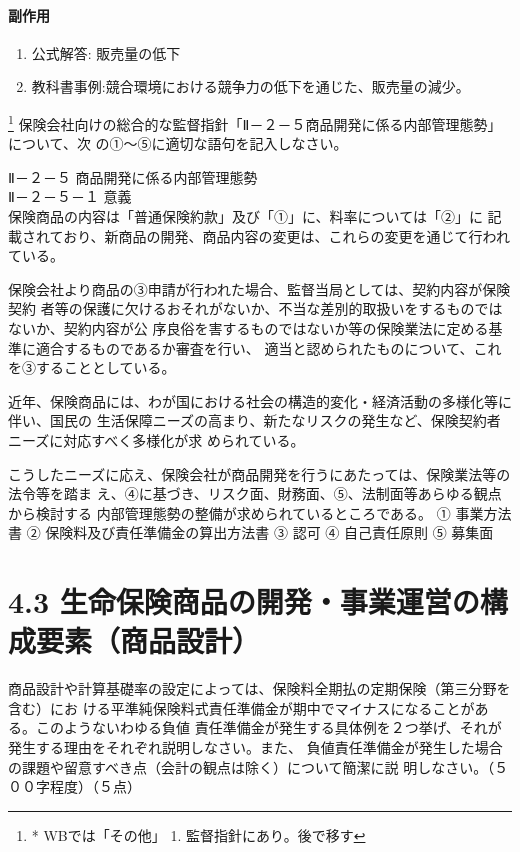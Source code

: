 \documentclass[report,gutter=10mm,fore-edge=10mm,uplatex,dvipdfmx]{jlreq}
\begin{document}
\paragraph{副作用}
\begin{enumerate}
 \item 公式解答: 販売量の低下
 \item 教科書事例:競合環境における競争力の低下を通じた、販売量の減少。
\end{enumerate}

\footnote{* WBでは「その他」 1. 監督指針にあり。後で移す}
保険会社向けの総合的な監督指針「Ⅱ－２－５商品開発に係る内部管理態勢」について、次
の①～⑤に適切な語句を記入しなさい。

Ⅱ－２－５ 商品開発に係る内部管理態勢\\
Ⅱ－２－５－１ 意義\\
保険商品の内容は「普通保険約款」及び「①」に、料率については「②」に
記載されており、新商品の開発、商品内容の変更は、これらの変更を通じて行われている。

保険会社より商品の③申請が行われた場合、監督当局としては、契約内容が保険契約
者等の保護に欠けるおそれがないか、不当な差別的取扱いをするものではないか、契約内容が公
序良俗を害するものではないか等の保険業法に定める基準に適合するものであるか審査を行い、
適当と認められたものについて、これを③することとしている。

近年、保険商品には、わが国における社会の構造的変化・経済活動の多様化等に伴い、国民の
生活保障ニーズの高まり、新たなリスクの発生など、保険契約者ニーズに対応すべく多様化が求
められている。

こうしたニーズに応え、保険会社が商品開発を行うにあたっては、保険業法等の法令等を踏ま
え、④に基づき、リスク面、財務面、⑤、法制面等あらゆる観点から検討する
内部管理態勢の整備が求められているところである。
① 事業方法書
② 保険料及び責任準備金の算出方法書
③ 認可
④ 自己責任原則
⑤ 募集面

\section{4.3 生命保険商品の開発・事業運営の構成要素（商品設計）}
商品設計や計算基礎率の設定によっては、保険料全期払の定期保険（第三分野を含む）にお
ける平準純保険料式責任準備金が期中でマイナスになることがある。このようないわゆる負値
責任準備金が発生する具体例を２つ挙げ、それが発生する理由をそれぞれ説明しなさい。また、
負値責任準備金が発生した場合の課題や留意すべき点（会計の観点は除く）について簡潔に説
明しなさい。（５００字程度）（５点）
\end{document}
